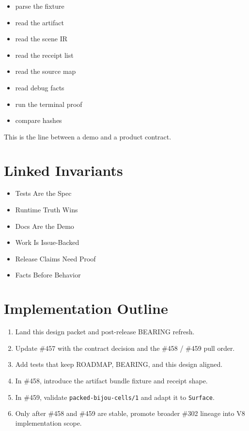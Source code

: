 \begin{itemize}
\tightlist
\item
  parse the fixture
\item
  read the artifact
\item
  read the scene IR
\item
  read the receipt list
\item
  read the source map
\item
  read debug facts
\item
  run the terminal proof
\item
  compare hashes
\end{itemize}

This is the line between a demo and a product contract.

\section{Linked Invariants}\label{record-144-linked-invariants}

\begin{itemize}
\tightlist
\item
  Tests Are the Spec
\item
  Runtime Truth Wins
\item
  Docs Are the Demo
\item
  Work Is Issue-Backed
\item
  Release Claims Need Proof
\item
  Facts Before Behavior
\end{itemize}

\section{Implementation Outline}\label{record-144-implementation-outline}

\begin{enumerate}
\def\labelenumi{\arabic{enumi}.}
\tightlist
\item
  Land this design packet and post-release BEARING refresh.
\item
  Update \#457 with the contract decision and the \#458 / \#459 pull order.
\item
  Add tests that keep ROADMAP, BEARING, and this design aligned.
\item
  In \#458, introduce the artifact bundle fixture and receipt shape.
\item
  In \#459, validate \texttt{p\allowbreak{}a\allowbreak{}c\allowbreak{}k\allowbreak{}e\allowbreak{}d\allowbreak{}-\allowbreak{}b\allowbreak{}i\allowbreak{}j\allowbreak{}o\allowbreak{}u\allowbreak{}-\allowbreak{}c\allowbreak{}e\allowbreak{}l\allowbreak{}l\allowbreak{}s\allowbreak{}/\allowbreak{}1} and adapt it to \texttt{S\allowbreak{}u\allowbreak{}r\allowbreak{}f\allowbreak{}a\allowbreak{}c\allowbreak{}e}.
\item
  Only after \#458 and \#459 are stable, promote broader \#302 lineage into V8 implementation scope.
\end{enumerate}

